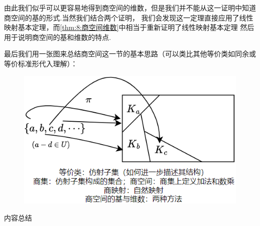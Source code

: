由此我们似乎可以更容易地得到商空间的维数，但是我们并不能从这一证明中知道商空间的基的形式.当然我们结合两个证明，
我们会发现这一定理直接应用了线性映射基本定理，而\autoref{thm:8:商空间维数}中相当于重新证明了线性映射基本定理
然后用于说明商空间的基和维数的特点.

最后我们用一张图来总结商空间这一节的基本思路（可以类比其他等价类如同余或等价标准形代入理解）：
\begin{figure}[h]
	\centering
	\includegraphics[scale=0.45]{./figs/8-1.png}
\end{figure}

\vspace{2ex}
\centerline{\heiti \Large 内容总结}

\vspace{2ex}

